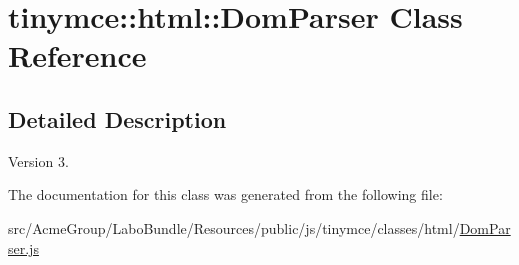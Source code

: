 \hypertarget{classtinymce_1_1html_1_1_dom_parser}{\section{tinymce\+:\+:html\+:\+:Dom\+Parser Class Reference}
\label{classtinymce_1_1html_1_1_dom_parser}
}


\subsection{Detailed Description}
\begin{DoxyVersion}{Version}
3. 
\end{DoxyVersion}


The documentation for this class was generated from the following file\+:\begin{DoxyCompactItemize}
\item 
src/\+Acme\+Group/\+Labo\+Bundle/\+Resources/public/js/tinymce/classes/html/\hyperlink{_dom_parser_8js}{Dom\+Parser.\+js}\end{DoxyCompactItemize}
